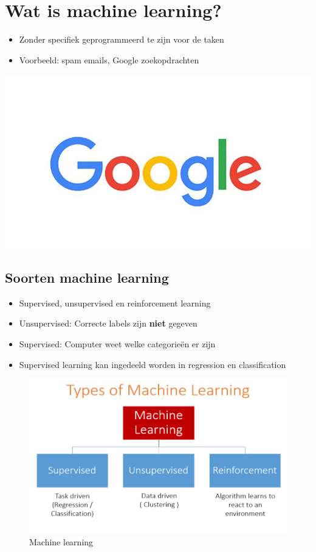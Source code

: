 \documentclass[11pt]{article}
\begin{document}
\section*{Wat is machine learning?}
\label{sec:org047cbfd}

\begin{itemize}
\item Zonder specifiek geprogrammeerd te zijn voor de taken
\item Voorbeeld: spam emails, Google zoekopdrachten
\end{itemize}

\begin{center}
\includegraphics[width=600]{./google.png}
\end{center}

\subsection*{Soorten machine learning}
\label{sec:orgf05f319}

\begin{itemize}
\item Supervised, unsupervised en reinforcement learning
\item Unsupervised: Correcte labels zijn \textbf{niet} gegeven
\item Supervised: Computer weet welke categorieën er zijn
\item Supervised learning kan ingedeeld worden in regression en classification
\end{itemize}

\begin{figure}[htbp]
\centering
\includegraphics[width=600]{./typesmachinelearning.png}
\caption{Machine learning}
\end{figure}
\end{document}
